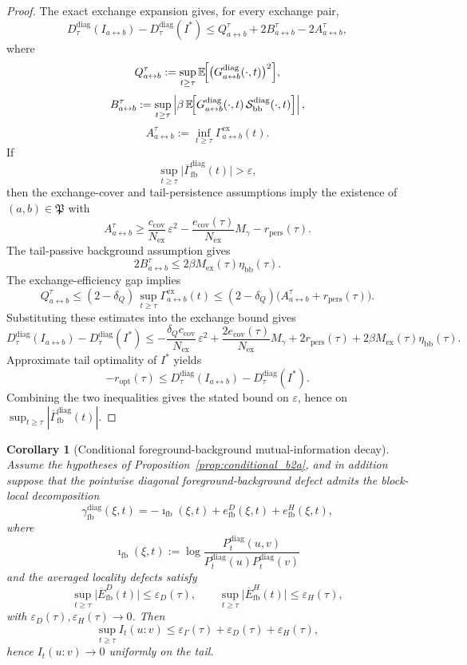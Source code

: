 \documentclass[12pt]{article}
\newtheorem{corollary}[theorem]{Corollary}
\theoremstyle{definition}
\theoremstyle{remark}
\begin{document}
\begin{proof}
The exact exchange expansion gives, for every exchange pair,
\[
D_\tau^{\mathrm{diag}}(I_{a\leftrightarrow b})
-
D_\tau^{\mathrm{diag}}(I^*)
\le
Q_{a\leftrightarrow b}^\tau
+
2B_{a\leftrightarrow b}^\tau
-
2A_{a\leftrightarrow b}^\tau,
\]
where
\[
Q_{a\leftrightarrow b}^\tau
:=
\sup_{t\ge\tau}
\mathbb E\!\Bigl[
\bigl(G_{a\leftrightarrow b}^{\mathrm{diag}}(\cdot,t)\bigr)^2
\Bigr],
\]
\[
B_{a\leftrightarrow b}^\tau
:=
\sup_{t\ge\tau}
\left|
\beta\,
\mathbb E\!\Bigl[
G_{a\leftrightarrow b}^{\mathrm{diag}}(\cdot,t)\,
\mathcal S_{\mathrm{bb}}^{\mathrm{diag}}(\cdot,t)
\Bigr]
\right|,
\]
\[
A_{a\leftrightarrow b}^\tau
:=
\inf_{t\ge\tau}
\Gamma_{a\leftrightarrow b}^{\mathrm{ex}}(t).
\]
If
\[
\sup_{t\ge\tau}
\bigl|
\overline{\Gamma}_{\mathrm{fb}}^{\mathrm{diag}}(t)
\bigr|
>
\varepsilon,
\]
then the exchange-cover and tail-persistence assumptions imply the
existence of \((a,b)\in\mathfrak P\) with
\[
A_{a\leftrightarrow b}^\tau
\ge
\frac{c_{\mathrm{cov}}}{N_{\mathrm{ex}}}\,\varepsilon^2
-
\frac{e_{\mathrm{cov}}(\tau)}{N_{\mathrm{ex}}}M_\gamma
-
r_{\mathrm{pers}}(\tau).
\]
The tail-passive background assumption gives
\[
2B_{a\leftrightarrow b}^\tau
\le
2\beta M_{\mathrm{ex}}(\tau)\eta_{\mathrm{bb}}(\tau).
\]
The exchange-efficiency gap implies
\[
Q_{a\leftrightarrow b}^\tau
\le
(2-\delta_Q)\,
\sup_{t\ge\tau}\Gamma_{a\leftrightarrow b}^{\mathrm{ex}}(t)
\le
(2-\delta_Q)\bigl(
A_{a\leftrightarrow b}^\tau+r_{\mathrm{pers}}(\tau)
\bigr).
\]
Substituting these estimates into the exchange bound gives
\[
D_\tau^{\mathrm{diag}}(I_{a\leftrightarrow b})
-
D_\tau^{\mathrm{diag}}(I^*)
\le
-
\frac{\delta_Q c_{\mathrm{cov}}}{N_{\mathrm{ex}}}\,\varepsilon^2
+
\frac{2e_{\mathrm{cov}}(\tau)}{N_{\mathrm{ex}}}M_\gamma
+
2r_{\mathrm{pers}}(\tau)
+
2\beta M_{\mathrm{ex}}(\tau)\eta_{\mathrm{bb}}(\tau).
\]
Approximate tail optimality of \(I^*\) yields
\[
-r_{\mathrm{opt}}(\tau)
\le
D_\tau^{\mathrm{diag}}(I_{a\leftrightarrow b})
-
D_\tau^{\mathrm{diag}}(I^*).
\]
Combining the two inequalities gives the stated bound on
\(\varepsilon\), hence on
\(\sup_{t\ge\tau}|\overline{\Gamma}_{\mathrm{fb}}^{\mathrm{diag}}(t)|\).
\end{proof}

\begin{corollary}[Conditional foreground-background mutual-information decay]\label{cor:conditional_b2b}
Assume the hypotheses of Proposition~\ref{prop:conditional_b2a}, and in
addition suppose that the pointwise diagonal foreground-background defect
admits the block-local decomposition
\[
\gamma_{\mathrm{fb}}^{\mathrm{diag}}(\xi,t)
=
-\imath_{\mathrm{fb}}(\xi,t)
+
e_{\mathrm{fb}}^D(\xi,t)
+
e_{\mathrm{fb}}^H(\xi,t),
\]
where
\[
\imath_{\mathrm{fb}}(\xi,t)
:=
\log\frac{P_t^{\mathrm{diag}}(u,v)}
{P_t^{\mathrm{diag}}(u)P_t^{\mathrm{diag}}(v)}
\]
and the averaged locality defects satisfy
\[
\sup_{t\ge\tau}
\bigl|
\overline{E}_{\mathrm{fb}}^D(t)
\bigr|
\le
\varepsilon_D(\tau),
\qquad
\sup_{t\ge\tau}
\bigl|
\overline{E}_{\mathrm{fb}}^H(t)
\bigr|
\le
\varepsilon_H(\tau),
\]
with \(\varepsilon_D(\tau),\varepsilon_H(\tau)\to 0\). Then
\[
\sup_{t\ge\tau}
I_t(u:v)
\le
\varepsilon_\Gamma(\tau)
+
\varepsilon_D(\tau)
+
\varepsilon_H(\tau),
\]
hence \(I_t(u:v)\to 0\) uniformly on the tail.
\end{corollary}
\end{document}
